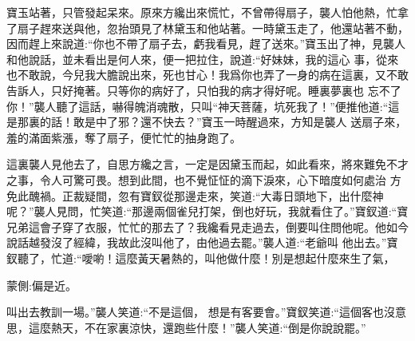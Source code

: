 \begin{parag}
    寶玉站著，只管發起呆來。原來方纔出來慌忙，不曾帶得扇子，襲人怕他熱，忙拿了扇子趕來送與他，忽抬頭見了林黛玉和他站著。一時黛玉走了，他還站著不動，因而趕上來說道:“你也不帶了扇子去，虧我看見，趕了送來。”寶玉出了神，見襲人和他說話，並未看出是何人來，便一把拉住，說道:“好妹妹，我的這心 事，從來也不敢說，今兒我大膽說出來，死也甘心！我爲你也弄了一身的病在這裏，又不敢告訴人，只好掩著。只等你的病好了，只怕我的病才得好呢。睡裏夢裏也 忘不了你！”襲人聽了這話，嚇得魄消魂散，只叫“神天菩薩，坑死我了！”便推他道:“這是那裏的話！敢是中了邪？還不快去？”寶玉一時醒過來，方知是襲人 送扇子來，羞的滿面紫漲，奪了扇子，便忙忙的抽身跑了。
\end{parag}


\begin{parag}
    這裏襲人見他去了，自思方纔之言，一定是因黛玉而起，如此看來，將來難免不才之事，令人可驚可畏。想到此間，也不覺怔怔的滴下淚來，心下暗度如何處治 方免此醜禍。正裁疑間，忽有寶釵從那邊走來，笑道:“大毒日頭地下，出什麼神呢？”襲人見問，忙笑道:“那邊兩個雀兒打架，倒也好玩，我就看住了。”寶釵道:“寶兄弟這會子穿了衣服，忙忙的那去了？我纔看見走過去，倒要叫住問他呢。他如今說話越發沒了經緯，我故此沒叫他了，由他過去罷。”襲人道:“老爺叫 他出去。”寶釵聽了，忙道:“噯喲！這麼黃天暑熱的，叫他做什麼！別是想起什麼來生了氣，\begin{note}蒙側:偏是近。\end{note}叫出去教訓一場。”襲人笑道:“不是這個， 想是有客要會。”寶釵笑道:“這個客也沒意思，這麼熱天，不在家裏涼快，還跑些什麼！”襲人笑道:“倒是你說說罷。”
\end{parag}


